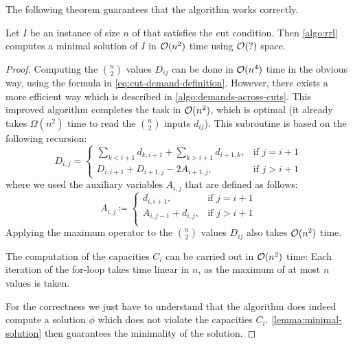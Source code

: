 The following theorem guarantees that the algorithm works correctly.
\begin{theorem}
	\label{theo:rll-algo-correct}
	Let $I$ be an instance of size $n$ of \RRL that satisfies the cut condition.
	Then \cref{algo:rrl} computes a minimal solution of $I$ in $\mathcal{O}(n^2)$ time using $\mathcal{O}(?)$ space.
\end{theorem}
\begin{proof}
	Computing the $\binom{n}{2}$ values $D_{ij}$ can be done in $\mathcal{O}(n^4)$ time in the obvious way, using the formula in \cref{eq:cut-demand-definition}.
	However, there exists a more efficient way which is described in \cref{algo:demands-across-cuts}.
	This improved algorithm completes the task in $\mathcal{O}(n^2)$, which is optimal (it already takes $\Omega(n^2)$ time to read the $\binom{n}{2}$ inputs $d_{ij}$).
	This subroutine is based on the following recursion:
	\begin{equation}
		D_{i, j} = \begin{cases}
			\sum_{k < i+1} d_{k,i+1} + \sum_{k > i+1} d_{i+1, k}, & \text{if } j = i+1 \\
			D_{i, i+1} + D_{i+1, j} - 2 A_{i+1, j}, & \text{if } j > i+1
		\end{cases}
	\end{equation}
	where we used the auxiliary variables $A_{i, j}$ that are defined as follows:
	\begin{equation}
		A_{i, j} \coloneqq \begin{cases}
				d_{i, i+1}, & \text{if } j = i+1\\
				A_{i, j-1} + d_{i, j}, &\text{if } j > i+1\\
		\end{cases}
	\end{equation}
	Applying the maximum operator to the $\binom{n}{2}$ values $D_{ij}$ also takes $\mathcal{O}(n^2)$ time.
	
	The computation of the capacities $C_i$ can be carried out in $\mathcal{O}(n^2)$ time:
	Each iteration of the for-loop takes time linear in $n$, as the maximum of at most $n$ values is taken.
	
	For the correctness we just have to understand that the algorithm does indeed compute a solution $\phi$ which does not violate the capacities $C_i$.
	\cref{lemma:minimal-solution} then guarantees the minimality of the solution.
	
	
\end{proof}

